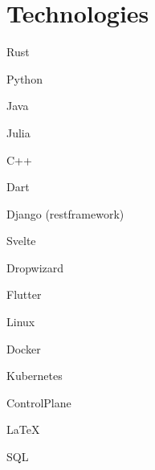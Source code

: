 \documentclass[hidelinks, 11pt]{scrartcl}
\begin{document}
\section{Technologies}
{
    \item[] Rust
    \item Python 
    \item Java
    \item Julia
    \item C++
    \item Dart
}

{
    \item[] Django (restframework)
    \item Svelte
    \item Dropwizard
    \item Flutter
}

{
    \item[] Linux
    \item Docker
    \item Kubernetes
    \item ControlPlane
    \item \LaTeX
    \item SQL
}

\vfill
{\color{mycolor}\titlerule}
\end{document}
